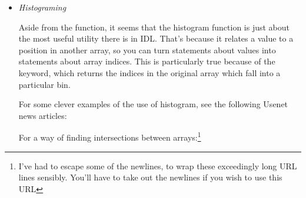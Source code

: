\begin{itemize}
  
\begin{alltt}

\textbf{PRO foo, a,b,c,k1=k1k2=k2,k3=k3,_extra=_extra}

   Some code here 

\textbf{END}

\end{alltt}

  And you call it as 


  Then, upon entry to this routine the \_extra keyword will the value

\begin{verbatim}
help,_extra,/struct
** Structure <1006f608>, 3 tags, length=10, refs=1:
   OVERPLOT        INT              1
   XMARGIN         INT       Array[2]
   XRANGE          INT       Array[2]
\end{verbatim}


  This works only when the author of the code has declared a \_extra
  keyword in the pro/function definition line, that first line in the
  source code .pro file. If this keyword is not declared, using
  undefined keywords results in a run time error.

  This mechanism allows the user to pass arbitrary keywords to IDL
  builtins, very frequently graphics routines, without having to code
  lots of logic for default cases where the keywords are or are not
  present. For instance, you can write a wrapper to a 
  command which hardcodes certain default and then allow the user to
  vary the others via the keywords contained in the \_extra keyword.

  

  \item \textit{Histograming}

  Aside from the  function, it seems that the histogram
  function is just about the most useful utility there is in
  IDL. That's because it relates a value to a position in another
  array, so you can turn statements about values into statements about
  array indices.  This is particularly true because of the
   keyword, which returns the indices in the
  original array which fall into a particular bin.


  For some clever examples of the use of histogram, see the following  Usenet
  news articles:

  For a way of finding intersections between arrays:\footnote{I've had
  to escape some of the newlines, to wrap these exceedingly long URL lines
  sensibly. You'll have to take out the newlines if you wish to use
  this URL}


\end{itemize}
